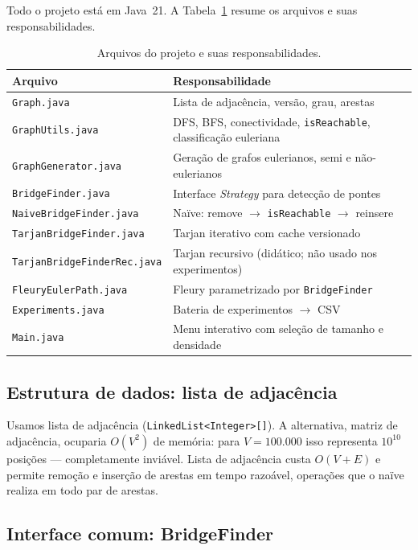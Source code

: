 \documentclass[12pt]{article}
\begin{document}
Todo o projeto está em Java~21. A Tabela~\ref{tab:arquivos} resume os
arquivos e suas responsabilidades.

\begin{table}[H]
\centering
\caption{Arquivos do projeto e suas responsabilidades.}
\label{tab:arquivos}
\small
\begin{tabular}{p{5.8cm}p{7.9cm}}
\toprule
Arquivo & Responsabilidade \\
\midrule
\texttt{Graph.java}                 & Lista de adjacência, versão, grau, arestas \\
\texttt{GraphUtils.java}            & DFS, BFS, conectividade, \texttt{isReachable}, classificação euleriana \\
\texttt{GraphGenerator.java}        & Geração de grafos eulerianos, semi e não-eulerianos \\
\texttt{BridgeFinder.java}          & Interface \textit{Strategy} para detecção de pontes \\
\texttt{NaiveBridgeFinder.java}     & Naïve: remove $\to$ \texttt{isReachable} $\to$ reinsere \\
\texttt{TarjanBridgeFinder.java}    & Tarjan iterativo com cache versionado \\
\texttt{\footnotesize TarjanBridgeFinderRec.java} & Tarjan recursivo (didático; não usado nos experimentos) \\
\texttt{FleuryEulerPath.java}       & Fleury parametrizado por \texttt{BridgeFinder} \\
\texttt{Experiments.java}           & Bateria de experimentos $\to$ CSV \\
\texttt{Main.java}                  & Menu interativo com seleção de tamanho e densidade \\
\bottomrule
\end{tabular}
\end{table}

\subsection{Estrutura de dados: lista de adjacência}

Usamos lista de adjacência (\texttt{LinkedList<Integer>[]}). A alternativa,
matriz de adjacência, ocuparia $O(V^2)$ de memória: para $V=100.000$ isso
representa $10^{10}$ posições --- completamente inviável. Lista de
adjacência custa $O(V{+}E)$ e permite remoção e inserção de arestas em
tempo razoável, operações que o naïve realiza em todo par de arestas.

\subsection{Interface comum: BridgeFinder}
\end{document}
